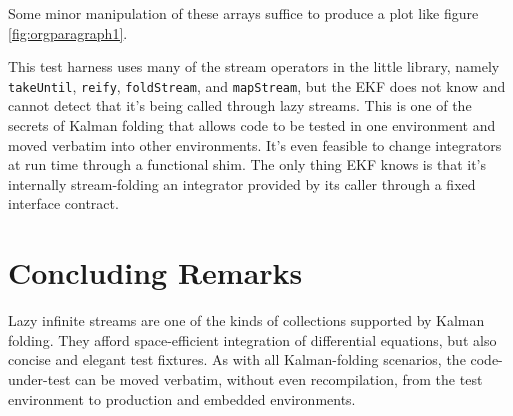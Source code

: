 \documentclass[10pt,oneside,x11names]{article}
\begin{document}
Some minor manipulation of these arrays suffice to produce a plot like figure 
\ref{fig:orgparagraph1}.

This test harness uses many of the stream operators in the little library,
namely \texttt{takeUntil}, \texttt{reify}, \texttt{foldStream}, and \texttt{mapStream}, but the EKF does not
know and cannot detect that it's being called through lazy streams. This is one
of the secrets of Kalman folding that allows code to be tested in one
environment and moved verbatim into other environments. It's even feasible to
change integrators at run time through a functional shim. The only thing EKF
knows is that it's internally stream-folding an integrator provided by its caller
through a fixed interface contract.

\section{Concluding Remarks}
\label{sec:orgheadline15}

Lazy infinite streams are one of the kinds of collections supported by Kalman
folding. They afford space-efficient integration of differential equations, but
also concise and elegant test fixtures. As with all Kalman-folding scenarios,
the code-under-test can be moved verbatim, without even recompilation, from the
test environment to production and embedded environments.
\end{document}
